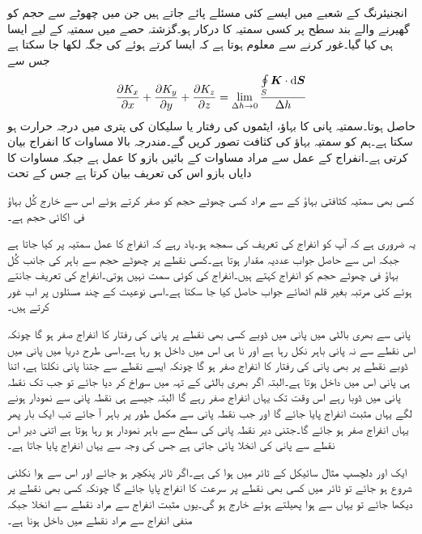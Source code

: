 انجنیئرنگ  کے شعبے میں ایسے کئی مسئلے پائے جاتے ہیں جن  میں چھوٹے سے حجم  کو گھیرنے والے بند سطح پر کسی سمتیہ  کا   درکار ہو۔گزشتہ حصے میں سمتیہ  کے لیے ایسا ہی کیا گیا۔غور کرنے سے معلوم ہوتا ہے کہ ایسا کرتے ہوئے   کی جگہ  لکھا جا سکتا ہے جس سے 
\begin{align}\label{مساوات_گاوس_کارتیسی_پھیلاو_کی_تعریف}
\frac{\partial K_x}{\partial x}+\frac{\partial K_y}{\partial y}+\frac{\partial K_z}{\partial z}=\lim_{\Delta h \to 0}\frac{\oint\limits_{S}\kvec{K}\cdot \dif \kvec{S}}{\Delta h}
\end{align}
حاصل ہوتا۔سمتیہ  پانی کا بہاؤ، ایٹموں کی رفتار یا سلیکان کی پتری میں درجہ حرارت ہو سکتا ہے۔ہم  کو سمتیہ بہاؤ کی کثافت تصور کریں گے۔مندرجہ بالا مساوات   کا انفراج بیان کرتی ہے۔انفراج کے عمل سے مراد مساوات کے بائیں بازو کا عمل ہے  جبکہ مساوات کا دایاں بازو اس کی تعریف بیان کرتا ہے جس کے تحت

کسی بھی سمتیہ کثافتی بہاؤ کے  سے مراد کسی  چھوٹے حجم کو صفر کرتے ہوئے اس  سے خارج کُل بہاؤ فی اکائی حجم ہے۔ 

یہ ضروری ہے کہ آپ کو انفراج کی تعریف کی سمجھ ہو۔یاد رہے کہ انفراج کا عمل سمتیہ پر کیا جاتا ہے جبکہ اس سے حاصل جواب عددیہ مقدار ہوتا ہے۔کسی نقطے پر چھوٹے حجم سے باہر کی  جانب کُل بہاؤ فی چھوٹے حجم کو انفراج کہتے ہیں۔انفراج کی کوئی سمت نہیں ہوتی۔انفراج کی تعریف جانتے ہوئے کئی مرتبہ بغیر قلم اٹھائے جواب حاصل کیا جا سکتا ہے۔اسی نوعیت کے چند مسئلوں پر اب غور کرتے ہیں۔

پانی سے بھری بالٹی میں پانی میں ڈوبے کسی بھی نقطے پر پانی کی رفتار کا انفراج صفر ہو گا چونکہ اس نقطے سے نہ پانی باہر نکل رہا ہے اور نا ہی اس میں داخل ہو رہا ہے۔اسی طرح دریا میں پانی میں ڈوبے نقطے پر بھی پانی کی رفتار کا انفراج صفر ہو گا چونکہ ایسے نقطے سے جتنا پانی نکلتا ہے، اتنا ہی پانی اس میں داخل ہوتا ہے۔البتہ اگر بھری بالٹی کے تہہ میں سوراخ کر دیا جائے  تو جب تک نقطہ پانی میں ڈوبا رہے اس وقت تک یہاں انفراج صفر رہے  گا البتہ جیسے ہی نقطہ پانی سے نمودار ہونے لگے یہاں مثبت انفراج پایا جائے گا اور جب نقطہ پانی سے مکمل طور پر باہر آ جائے تب ایک بار پھر یہاں انفراج صفر ہو جائے گا۔جتنی دیر نقطہ پانی کی سطح سے باہر نمودار ہو رہا ہوتا ہے اتنی دیر اس نقطے سے پانی کی انخلا پائی جاتی ہے جس کی وجہ سے یہاں انفراج پایا جاتا ہے۔

ایک اور دلچسپ مثال سائیکل کے ٹائر میں ہوا کی ہے۔اگر ٹائر پنکچر ہو جائے اور اس سے ہوا نکلنی شروع ہو جائے تو ٹائر میں کسی بھی نقطے پر سرعت کا انفراج پایا جائے گا چونکہ کسی بھی نقطے پر دیکھا جائے تو یہاں سے ہوا پھیلتے ہوئے خارج ہو گی۔یوں مثبت انفراج سے مراد نقطے سے انخلا جبکہ منفی انفراج سے مراد نقطے میں داخل ہونا ہے۔ 

